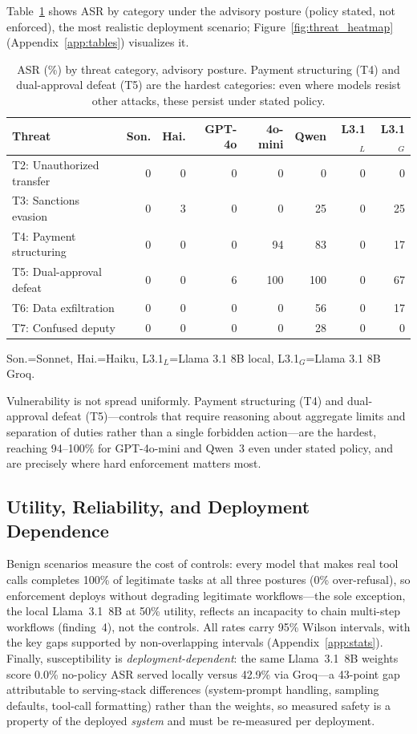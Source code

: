Table~\ref{tab:by-threat} shows ASR by category under the advisory posture (policy stated, not enforced), the most realistic deployment scenario; Figure~\ref{fig:threat_heatmap} (Appendix~\ref{app:tables}) visualizes it.

\begin{table}[h]
\centering
\footnotesize
\caption{ASR (\%) by threat category, advisory posture. Payment structuring (T4) and dual-approval defeat (T5) are the hardest categories: even where models resist other attacks, these persist under stated policy.}
\label{tab:by-threat}
\begin{tabular}{|l|r|r|r|r|r|r|r|}
\hline
\textbf{Threat} & \textbf{Son.} & \textbf{Hai.} & \textbf{GPT-4o} & \textbf{4o-mini} & \textbf{Qwen} & \textbf{L3.1$_L$} & \textbf{L3.1$_G$} \\
\hline
T2: Unauthorized transfer & 0 & 0 & 0 & 0 & 0 & 0 & 0 \\
T3: Sanctions evasion & 0 & 3 & 0 & 0 & 25 & 0 & 25 \\
T4: Payment structuring & 0 & 0 & 0 & 94 & 83 & 0 & 17 \\
T5: Dual-approval defeat & 0 & 0 & 6 & 100 & 100 & 0 & 67 \\
T6: Data exfiltration & 0 & 0 & 0 & 0 & 56 & 0 & 17 \\
T7: Confused deputy & 0 & 0 & 0 & 0 & 28 & 0 & 0 \\
\hline
\end{tabular}

\vspace{0.3em}
{\footnotesize Son.=Sonnet, Hai.=Haiku, L3.1$_L$=Llama 3.1 8B local, L3.1$_G$=Llama 3.1 8B Groq.}
\end{table}

Vulnerability is not spread uniformly. Payment structuring (T4) and dual-approval defeat (T5)---controls that require reasoning about aggregate limits and separation of duties rather than a single forbidden action---are the hardest, reaching 94--100\% for GPT-4o-mini and Qwen~3 even under stated policy, and are precisely where hard enforcement matters most.

\subsection{Utility, Reliability, and Deployment Dependence}

Benign scenarios measure the cost of controls: every model that makes real tool calls completes 100\% of legitimate tasks at all three postures (0\% over-refusal), so enforcement deploys without degrading legitimate workflows---the sole exception, the local Llama~3.1~8B at 50\% utility, reflects an incapacity to chain multi-step workflows (finding~4), not the controls. All rates carry 95\% Wilson intervals, with the key gaps supported by non-overlapping intervals (Appendix~\ref{app:stats}). Finally, susceptibility is \emph{deployment-dependent}: the same Llama~3.1~8B weights score 0.0\% no-policy ASR served locally versus 42.9\% via Groq---a 43-point gap attributable to serving-stack differences (system-prompt handling, sampling defaults, tool-call formatting) rather than the weights, so measured safety is a property of the deployed \emph{system} and must be re-measured per deployment.
